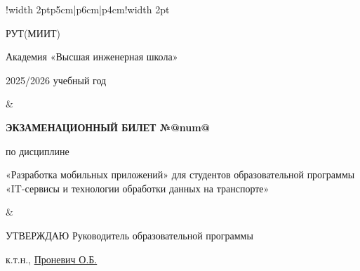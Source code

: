 
\begin{tabular}{!{\vrule width 2pt}p{5cm}|p{6cm}|p{4cm}!{\vrule width 2pt}}

    {\centering 
    \fontsize{14pt}{16pt}\selectfont
    РУТ(МИИТ)

\vspace{14pt}

Академия «Высшая инженерная школа»

\vspace{14pt}

2025/2026 учебный год

    }
&
{
    \centering
\fontsize{14pt}{16pt}\selectfont

\textbf{ЭКЗАМЕНАЦИОННЫЙ
БИЛЕТ №@num@}


по дисциплине 

«Разработка мобильных приложений» 
\fontsize{12pt}{14pt}\selectfont
для студентов образовательной программы «IT-сервисы и технологии обработки данных на транспорте»

}
&
{
\centering
\fontsize{14pt}{16pt}\selectfont

УТВЕРЖДАЮ
Руководитель образовательной программы

\vspace{1cm}

\fontsize{12pt}{14pt}\selectfont
\underline{\hspace{3cm}}

к.т.н., \underline{Проневич О.Б.}

}
\\
\hline
{}
\\
\end{tabular}

\newpage
